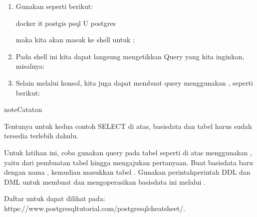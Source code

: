 \documentclass[letterpaper,10pt,english]{sphinxmanual}
\begin{document}
\begin{enumerate}
\item {} 
Gunakan  seperti berikut:

\begin{sphinxVerbatim}[commandchars=\\\{\}]
docker  \PYGZhy{}it postgis psql \PYGZhy{}U postgres
\end{sphinxVerbatim}

maka kita akan masuk ke shell untuk :

\item {} 
Pada shell ini kita dapat langsung mengetikkan Query yang kita inginkan, misalnya:

\item {} 
Selain melalui konsol, kita juga dapat membuat query menggunakan , seperti berikut:

\begin{sphinxVerbatim}[commandchars=\\\{\}]
          
\end{sphinxVerbatim}

\end{enumerate}

\begin{sphinxadmonition}{note}{Catatan}

Tentunya untuk kedua contoh SELECT di atas, basisdata  dan tabel  harus sudah tersedia terlebih dahulu.
\end{sphinxadmonition}

Untuk latihan ini, coba gunakan query pada tabel  seperti di atas menggunakan , yaitu dari pembuatan tabel hingga mengajukan pertanyaan. Buat basisdata baru dengan nama , kemudian masukkan tabel . Gunakan perintah\sphinxhyphen{}perintah DDL dan DML untuk membuat dan mengoperasikan basisdata ini melalui .

Daftar  untuk  dapat dilihat pada:
https://www.postgresqltutorial.com/postgresql\sphinxhyphen{}cheat\sphinxhyphen{}sheet/.
\end{document}
